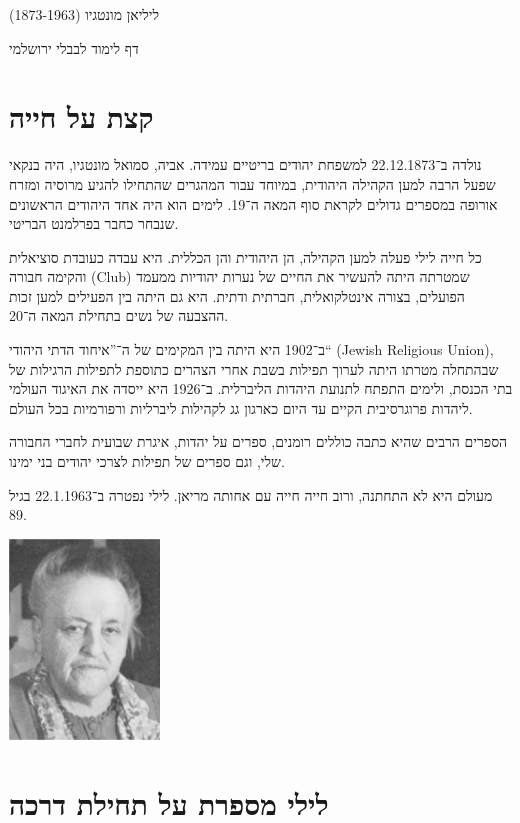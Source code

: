 \documentclass[14pt, article, extrafontsizes, twopage, a4paper]{memoir}
\begin{document}
{
  \centering
  \LARGE ליליאן מונטגיו (1873-1963)

  \Large דף לימוד לבבלי ירושלמי

}

\chapter{קצת על חייה}

נולדה ב־22.12.1873 למשפחת יהודים בריטיים עמידה. אביה, סמואל מונטגיו, היה בנקאי שפעל הרבה למען הקהילה היהודית, במיוחד עבור המהגרים שהתחילו להגיע מרוסיה ומזרח אורופה במספרים גדולים לקראת סוף המאה ה־19. לימים הוא היה אחד היהודים הראשונים שנבחר כחבר בפרלמנט הבריטי.

כל חייה לילי פעלה למען הקהילה, הן היהודית והן הכללית. היא עבדה כעובדת סוציאלית והקימה חבורה (\textenglish{Club}) שמטרתה היתה להעשיר את החיים של נערות יהודיות ממעמד הפועלים, בצורה אינטלקואלית, חברתית ודתית. היא גם היתה בין הפעילים למען זכות ההצבעה של נשים בתחילת המאה ה־20.

ב־1902 היא היתה בין המקימים של ה־”איחוד הדתי היהודי“ (\textenglish{Jewish Religious Union}), שבהתחלה מטרתו היתה לערוך תפילות בשבת אחרי הצהרים  כתוספת לתפילות הרגילות של בתי הכנסת, ולימים התפתח לתנועת היהדות הליברלית. ב־1926 היא ייסדה את האיגוד העולמי ליהדות פרוגרסיבית הקיים עד היום כארגון גג לקהילות ליברליות ורפורמיות בכל העולם.

הספרים הרבים שהיא כתבה כוללים רומנים, ספרים על יהדות, איגרת שבועית לחברי החבורה שלי, וגם ספרים של תפילות לצרכי יהודים בני ימינו.

מעולם היא לא התחתנה, ורוב חייה חייה עם אחותה מריאן. לילי נפטרה ב־22.1.1963 בגיל 89.

{
  \centering
\includegraphics[width=4cm]{lilyolder.png}\\

}


\chapter{לילי מספרת על תחילת דרכה}
\end{document}
